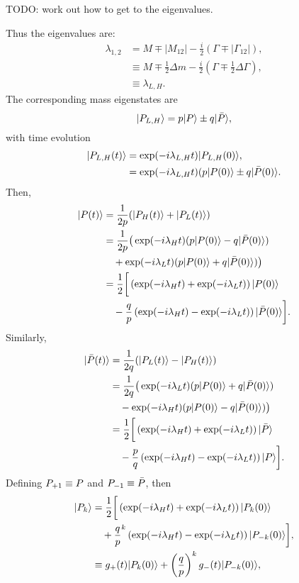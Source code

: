 \documentclass{report}
\def\PPbar{\ensuremath{\bar{\PP}}\xspace}
\def\PPp{\ensuremath{\PP_{+1}}\xspace}
\def\PPm{\ensuremath{\PP_{-1}}\xspace}
\def\Deltam{\ensuremath{\Delta m}\xspace}
\def\Deltagamma{\ensuremath{\Delta\Gamma}\xspace}
\def\lambdalh{\ensuremath{\lambda_{L,H}}\xspace}
\def\PPlh{\ensuremath{\PP_{L,H}}\xspace}
\def\PPh{\ensuremath{\PP_H}\xspace}
\def\PPl{\ensuremath{\PP_L}\xspace}
\def\half{\ensuremath{\frac{1}{2}}\xspace}
\def\PPk{\ensuremath{\PP_k}\xspace}
\def\PPkm{\ensuremath{\PP_{-k}}\xspace}
\begin{document}
TODO: work out how to get to the eigenvalues.

Thus the eigenvalues are:
\begin{align}
  \lambda_{1,2} &= M \mp |M_{12}| - \frac{i}{2}(\Gamma \mp |\Gamma_{12}|), \\
  &\equiv M \mp \frac{1}{2} \Deltam - \frac{i}{2}\left(\Gamma \mp \frac{1}{2} \Deltagamma\right),\\
  &\equiv \lambdalh.
\end{align}
The corresponding mass eigenstates are
\begin{equation}
  \ket{\PPlh} = p \ket{\PP} \pm q \ket{\PPbar},
\end{equation}
with time evolution
\begin{align}
  \ket{\PPlh(t)} &= \exp(-i \lambdalh t) \ket{\PPlh(0)}, \\
  &= \exp(-i \lambdalh t)(p\ket{\PP(0)} \pm q \ket{\PPbar(0)}.
\end{align}
Then,
\begin{align}
  \ket{\PP(t)} & = \frac{1}{2p}(\ket{\PPh(t)} + \ket{\PPl(t)}) \\
  & = \frac{1}{2p}\big(\exp(-i\lambda_H t)(p\ket{\PP(0)} - q \ket{\PPbar(0)}) \\
  & \quad + \exp(-i\lambda_L t)(p\ket{\PP(0)} + q \ket{\PPbar(0)})\big) \\
  &= \half \bigg[\left(\exp(-i\lambda_H t) + \exp(-i\lambda_L t)\right) \ket{\PP(0)} \\
    & \quad - \frac{q}{p}\left(\exp(-i\lambda_H t) - \exp(-i\lambda_L t)\right) \ket{\PPbar(0)}\bigg].
\end{align}
Similarly,
\begin{align}
  \ket{\PPbar(t)} & = \frac{1}{2q}(\ket{\PPl(t)} - \ket{\PPh(t)}) \\
  & = \frac{1}{2q}\big(\exp(-i\lambda_L t)(p\ket{\PP(0)} + q \ket{\PPbar(0)}) \\
  & \quad - \exp(-i\lambda_H t)(p\ket{\PP(0)} - q \ket{\PPbar(0)})\big) \\
  &= \half \bigg[\left(\exp(-i\lambda_H t) + \exp(-i\lambda_L t)\right) \ket{\PPbar} \\
    & \quad - \frac{p}{q}\left(\exp(-i\lambda_H t) - \exp(-i\lambda_L t)\right) \ket{\PP}\bigg].
\end{align}
Defining $\PPp \equiv \PP$ and $\PPm \equiv \PPbar$, then
\begin{align}
  \ket{\PPk} &= \half \bigg[\left(\exp(-i \lambda_H t) + \exp(-i \lambda_L t)\right) \ket{\PPk(0)} \\
    & \quad + \frac{q}{p}^k \left(\exp(-i \lambda_H t) - \exp(-i \lambda_L t)\right) \ket{\PPkm(0)}\bigg], \\
    &\equiv g_+(t) \ket{\PPk(0)} + \left(\frac{q}{p}\right)^k g_-(t) \ket{\PPkm(0)},
\end{align}
\end{document}
